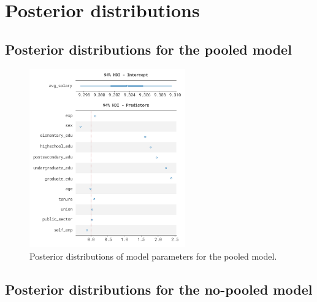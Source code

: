 \chapter{Posterior distributions}\label{app:posterior_dists}

\section{Posterior distributions for the pooled model}

\begin{figure}[H]
    \centering
    \includegraphics[width=0.6\textwidth]{images/appendix/pooled.png}
    \caption{Posterior distributions of model parameters for the pooled model.}
    \label{fig:posterior_dists_pooled}
\end{figure}

\section{Posterior distributions for the no-pooled model}

